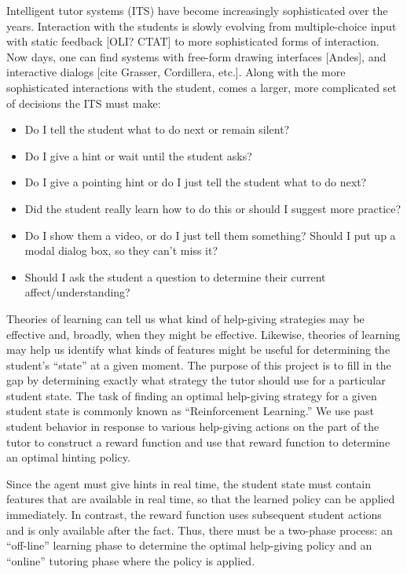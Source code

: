 \documentclass{edm_template}
\begin{document}
Intelligent tutor systems (ITS) have become increasingly sophisticated
over the years.  Interaction with the students is slowly evolving
from multiple-choice input with static feedback [OLI? CTAT] to more 
sophisticated forms of interaction.  Now days, one can find systems with 
free-form drawing interfaces [Andes], and interactive dialogs [cite Grasser,
Cordillera, etc.].  Along with the more sophisticated interactions
with the student, comes a larger, more complicated set of 
decisions the ITS must make:
%
\begin{itemize}
   \item Do I tell the student what to do next or remain silent?

   \item Do I give a hint or wait until the student asks?

   \item Do I give a pointing hint or do I just tell the student 
         what to do next?

   \item Did the student really learn how to do this or should
         I suggest more practice?

   \item Do I show them a video, or do I just tell them something?
         Should I put up a modal dialog box, so they can't miss it?

   \item Should I ask the student a question to determine their 
         current affect/understanding?

\end{itemize}

Theories of learning can tell us what kind of help-giving
strategies may be effective and, broadly, when they might be effective.
Likewise, theories of learning may help us identify what kinds of 
features might be useful for determining the student's ``state'' at
a given moment.  The purpose of this project is to fill in the gap
by determining exactly what strategy the tutor should use for a 
particular student state.
The task of finding an optimal help-giving strategy for a
given student state is commonly known as ``Reinforcement Learning.''
We use past student behavior in response to various help-giving
actions on the part of the tutor to construct a reward function
and use that reward function to determine an optimal hinting policy.

Since the agent must give hints in real time, the student state
must contain features that are available in real time, so that
the learned policy can be applied immediately.  In contrast,
the reward function uses subsequent student actions and is only
available after the fact.  Thus, there must be a two-phase process:
an ``off-line'' learning phase to determine the optimal help-giving 
policy and an ``online'' tutoring phase where the policy is applied.
\end{document}
